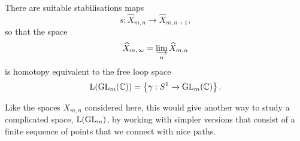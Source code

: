 \begin{conjecture}
  There are suitable stabilisations maps
  \[ s : \widehat{X}_{m,n} \to \widehat{X}_{m,n+1}, \]
  so that the space
  \[ \widehat{X}_{m,\infty} = \varinjlim_n \widehat{X}_{m,n} \]
  is homotopy equivalent to the free loop space
  \[ \mathrm{L}(\operatorname{GL}_m(\mathbb{C})) = \left\{  \gamma : S^1 \to \operatorname{GL}_m(\mathbb{C})  \right\}. \]
\end{conjecture}

Like the spaces $X_{m,n}$ considered here, this would give another way
to study a complicated space, $\mathrm{L}(\operatorname{GL}_m)$, by working with
simpler versions that consist of a finite sequence of points that we
connect with nice paths.




